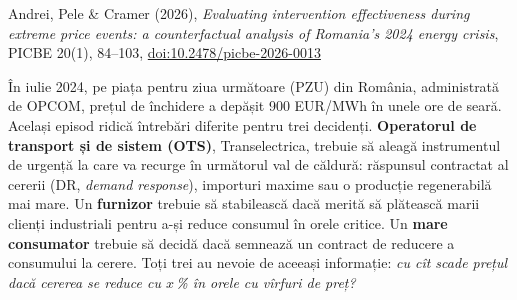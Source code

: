 
\renewcommand{\emqacase}{\T{Research case 1 (Lecture 1)}{Studiul de caz 1 (cursul 1)}}

%
          { Andrei, Pele \& Cramer (2026), \emph{Evaluating intervention effectiveness during extreme price events:
           a counterfactual analysis of Romania's 2024 energy crisis}, PICBE 20(1), 84--103, \href{https://doi.org/10.2478/picbe-2026-0013}{doi:10.2478/picbe-2026-0013}}

\begin{scenario}
%
{În iulie 2024, pe piața pentru ziua următoare (PZU) din România, administrată de OPCOM, prețul de închidere a depășit 900 EUR/MWh în unele ore de seară.
Același episod ridică întrebări diferite pentru trei decidenți.
\textbf{Operatorul de transport și de sistem (OTS)}, Transelectrica, trebuie să aleagă instrumentul de urgență la care va recurge în următorul val de căldură: răspunsul contractat al cererii (DR, \emph{demand response}), importuri maxime sau o producție regenerabilă mai mare.
Un \textbf{furnizor} trebuie să stabilească dacă merită să plătească marii clienți industriali pentru a-și reduce consumul în orele critice.
Un \textbf{mare consumator} trebuie să decidă dacă semnează un contract de reducere a consumului la cerere.
Toți trei au nevoie de aceeași informație: \emph{cu cît scade prețul dacă cererea se reduce cu $x$\,\% în orele cu vîrfuri de preț?}}
\end{scenario}

